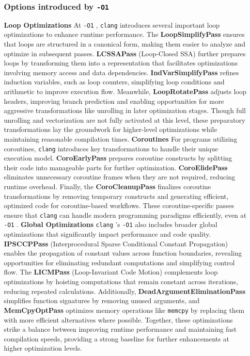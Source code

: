 \documentclass{rapport}
\newcommand{\clang}{\texttt{clang} }
\newcommand{\optione}{\texttt{-O1} }
\begin{document}
\subsubsection{Options introduced by \optione}
\textbf{Loop Optimizations} \newline
At \optione, \clang introduces several important loop optimizations to enhance runtime performance. The \textbf{LoopSimplifyPass} ensures that loops are structured 
in a canonical form, making them easier to analyze and optimize in subsequent passes. \textbf{LCSSAPass} (Loop-Closed SSA) further prepares loops by transforming 
them into a representation that facilitates optimizations involving memory access and data dependencies. \textbf{IndVarSimplifyPass} refines induction variables,
such as loop counters, simplifying loop conditions and arithmetic to improve execution flow. 
Meanwhile, \textbf{LoopRotatePass} adjusts loop headers, improving branch prediction and enabling opportunities for more aggressive transformations like unrolling
in later optimization stages. 
Though full unrolling and vectorization are not fully activated at this level, these preparatory transformations lay the groundwork for higher-level optimizations while maintaining reasonable compilation times.
\newline\newline
\textbf{Coroutines}\newline
For programs utilizing coroutines, \clang introduces key transformations to handle their unique execution model. 
\textbf{CoroEarlyPass} prepares coroutine constructs by splitting their code into manageable parts for further optimization. 
\textbf{CoroElidePass} eliminates unnecessary coroutine frames when they are not required, reducing runtime overhead. 
Finally, the \textbf{CoroCleanupPass} finalizes coroutine transformations by removing temporary constructs and generating efficient, optimized code for 
coroutine-based workflows. These coroutine-specific passes ensure that \clang can handle modern programming paradigms efficiently, even at \optione.
\newline\newline
\textbf{Global Optimizations}\newline
\clang’s \optione also includes broader global optimizations that significantly impact performance and code quality. \textbf{IPSCCPPass} (Interprocedural Sparse Conditional Constant Propagation) 
enables the propagation of constant values across function boundaries, revealing opportunities for eliminating redundant computations and simplifying control flow. 
The \textbf{LICMPass} (Loop-Invariant Code Motion) complements loop optimizations by hoisting computations that remain constant across iterations, reducing repeated calculations. 
Additionally, \textbf{DeadArgumentEliminationPass} simplifies function signatures by removing unused arguments, and \textbf{MemCpyOptPass} optimizes memory operations like \texttt{memcpy} 
by replacing them with more efficient alternatives where possible. Together, these optimizations strike a balance between improving runtime performance and maintaining fast compilation 
speeds, providing a strong baseline for further enhancements at higher optimization levels.
\end{document}
